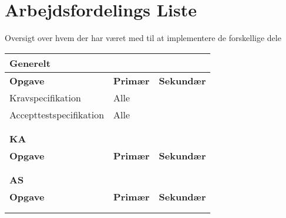 \section{Arbejdsfordelings Liste}

Oversigt over hvem der har været med til at implementere de forskellige dele

\begin{table}[h]
\begin{tabular}{lll}

\hline
\multicolumn{3}{|l|}{{\color{lblue} \textbf{Generelt}}}                                                                                        \\ \hline
\multicolumn{1}{|l|}{\textbf{Opgave}}           & \multicolumn{1}{l|}{\textbf{Primær}}                       & \multicolumn{1}{l|}{\textbf{Sekundær}} \\ \hline
\multicolumn{1}{|l|}{Kravspecifikation}         & \multicolumn{1}{l|}{Alle}                                  & \multicolumn{1}{l|}{}                  \\ \hline
\multicolumn{1}{|l|}{Accepttestspecifikation}   & \multicolumn{1}{l|}{Alle}                                  & \multicolumn{1}{l|}{}                  \\ \hline
& & \\& & \\ \hline                                                    


\multicolumn{3}{|l|}{\color{lblue} \textbf{\gls{KA}}}                                                                                                               \\ \hline
\multicolumn{1}{|l|}{\textbf{Opgave}}           & \multicolumn{1}{l|}{\textbf{Primær}}                       & \multicolumn{1}{l|}{\textbf{Sekundær}} \\ \hline
& & \\& & \\ \hline                                           


\multicolumn{3}{|l|}{\color{lblue} \textbf{\gls{AS}}}                                                                                                               \\ \hline
\multicolumn{1}{|l|}{\textbf{Opgave}}           & \multicolumn{1}{l|}{\textbf{Primær}}                       & \multicolumn{1}{l|}{\textbf{Sekundær}} \\ \hline
& & \\& & \\ \hline 



\end{tabular}
\end{table}
